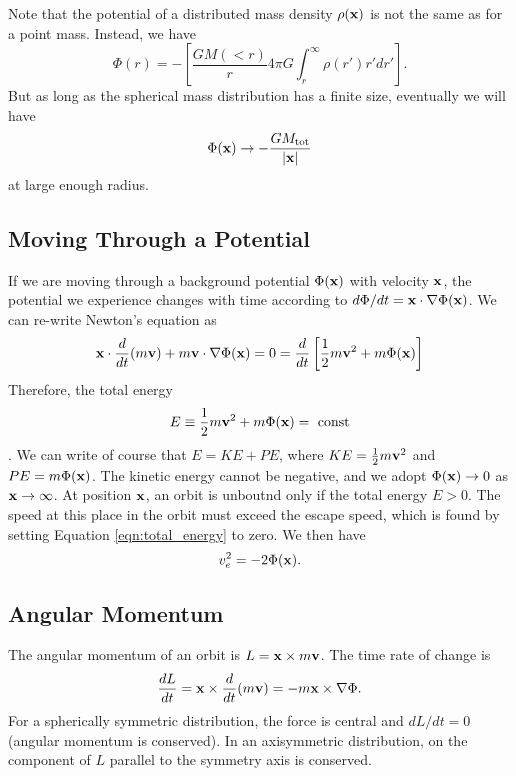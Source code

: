 \documentclass[]{article}
\begin{document}
Note that the potential of a distributed mass density $\rho(\mathbf{x})$
is not the same as for a point mass.  Instead, we have
\begin{equation}
\Phi(r) = - \left[ \frac{GM(<r)}{r} 4 \pi G \int_{r}^{\infty} \rho(r') r' dr'\right].
\end{equation}
\noindent
But as long as the spherical mass distribution has a finite size, eventually we 
will have
\begin{equation}
\Phi(\mathbf{x}) \to - \frac{G M_{\mathrm{tot}}}{|\mathbf{x}|}
\end{equation}
\noindent
at large enough radius.


\subsection{Moving Through a Potential}

If we are moving through a background potential $\Phi(\mathbf{x})$ with
velocity $\mathbf{x}$, the potential we experience changes
with time according to $d\Phi/dt = \mathbf{x}\cdot\nabla\Phi(\mathbf{x})$.
We can re-write Newton's equation as
\begin{equation}
\mathbf{x} \cdot \frac{d}{dt} ( m\mathbf{v}) + m \mathbf{v}\cdot\nabla \Phi(\mathbf{x}) = 0 = \frac{d}{dt}\left[\frac{1}{2}m\mathbf{v}^{2} + m \Phi(\mathbf{x})\right]
\end{equation}
\noindent
Therefore, the total energy
\begin{equation}
\label{eqn:total_energy}
E \equiv \frac{1}{2} m\mathbf{v}^{2} + m\Phi(\mathbf{x}) =~\mathrm{const}
\end{equation}
\noindent.
We can write of course that $E = KE + PE$, where $KE = \frac{1}{2}m\mathbf{v}^{2}$ and $PE = m\Phi(\mathbf{x})$.
The kinetic energy cannot be negative, and we adopt $\Phi(\mathbf{x})\to0$ as $\mathbf{x}\to\infty$.  At position
$\mathbf{x}$, an orbit is unboutnd only if the total energy $E>0$. The speed at this place in the
orbit must exceed the escape speed, which is found by setting Equation \ref{eqn:total_energy} to zero.
We then have
\begin{equation}
v_{e}^{2} = - 2 \Phi(\mathbf{x}).
\end{equation}

\subsection{Angular Momentum}

The angular momentum of an orbit is $L = \mathbf{x} \times m\mathbf{v}$. The time rate of change is
\begin{equation}
\frac{dL}{dt} = \mathbf{x} \times \frac{d}{dt} (m \mathbf{v}) = -m\mathbf{x} \times \nabla \Phi.
\end{equation}
\noindent
For a spherically symmetric distribution, the force is central and $dL/dt = 0$ (angular
momentum is conserved).
In an axisymmetric distribution, on the component of $L$ parallel to the symmetry
axis is conserved.
\end{document}
